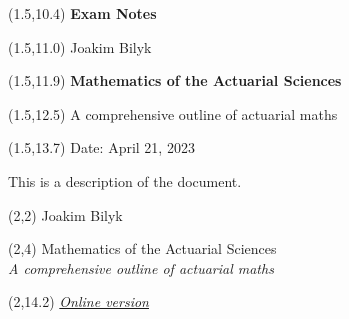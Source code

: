 \documentclass[a4paper,12pt,openany]{book}
\begin{document}
\thispagestyle{empty}

\begin{textblock}{12}(1.5,10.4) \noindent\fontsize{20}{20}\selectfont \textbf{Exam Notes}
\end{textblock}

\begin{textblock}{12}(1.5,11.0) \noindent\fontsize{14}{14}\selectfont Joakim Bilyk
\end{textblock}

\begin{textblock}{12}(1.5,11.9)
\noindent\fontsize{20}{20}\selectfont \textbf{Mathematics of the Actuarial Sciences}
\end{textblock}

\begin{textblock}{12}(1.5,12.5)
    \noindent\fontsize{14}{14}\selectfont A comprehensive outline of actuarial maths
\end{textblock}

\begin{textblock}{12}(1.5,13.7)
\noindent\fontsize{11}{11}\selectfont Date: April 21, 2023
\end{textblock}

\hspace{1pt}
\newpage

\onehalfspacing
\thispagestyle{empty}
\noindent

This is a description of the document.

\newpage

\thispagestyle{empty}

\begin{textblock}{12}(2,2)
\noindent\fontsize{20}{20}\selectfont Joakim Bilyk
\end{textblock}

\begin{textblock}{12}(2,4)
\noindent\fontsize{35pt}{40pt}\selectfont Mathematics of the Actuarial Sciences\\
\fontsize{20pt}{40pt}\selectfont \emph{A comprehensive outline of actuarial maths}
\end{textblock}

\begin{textblock}{12}(2,14.2)
\noindent\fontsize{16}{11}\selectfont \emph{\href{https://joakim-bilyk.github.io/books/exam}{Online version}}
\end{textblock}
\end{document}
